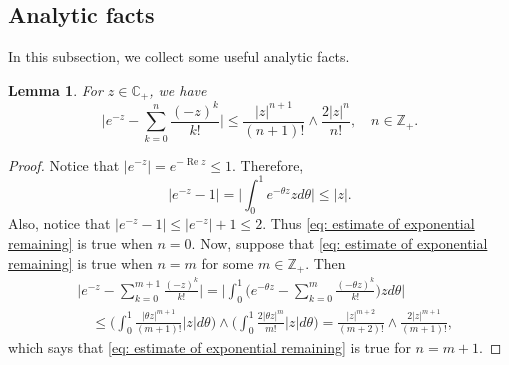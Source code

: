 \documentclass[12pt,a4paper]{amsart}
\theoremstyle{plain}
\newtheorem{lem}[thm]{Lemma}
\theoremstyle{definition}
\numberwithin{equation}{section}
\begin{document}
\subsection{Analytic facts}
In this subsection, we collect some useful analytic facts.
\begin{lem}
  \label{lem: estimate of exponential remaining}
  For $z\in \mathbb C_+$,  we have
  \begin{equation}
    \label{eq: estimate of exponential remaining}
    \Big|e^{-z} - \sum_{k=0}^n \frac{(-z)^k}{k!} \Big|
    \leq \frac{|z|^{n+1}}{(n+1)!} \wedge \frac{2|z|^{n}}{n!}, \quad n\in \mathbb Z_+.
  \end{equation}
\end{lem}
\begin{proof}
  Notice that $|e^{-z}| = e^{- \operatorname{Re} z} \leq 1$.
  Therefore,
\begin{equation}
  |e^{-z} - 1|
  = \Big| \int_0^1 e^{-\theta z} z d\theta\Big|
  \leq |z|.
\end{equation}
Also, notice that $|e^{-z} - 1| \leq |e^{-z}|+1 \leq 2$.
Thus \eqref{eq: estimate of exponential remaining} is true when $n = 0$.
Now, suppose that \eqref{eq: estimate of exponential remaining} is true when $n = m$ for some $m \in \mathbb Z_+$.
Then
\begin{align}
  &\Big|e^{-z} - \sum_{k=0}^{m+1} \frac{(-z)^k}{k!}\Big|
    = \Big| \int_0^1\Big(e^{-\theta z} - \sum_{k=0}^m \frac{(-\theta z)^k}{k!} \Big) z d\theta \Big| \\
  & \quad \leq  \Big(\int_0^1 \frac{|\theta z|^{m+1}}{(m+1)!} |z| d\theta\Big) \wedge \Big(\int_0^1 \frac{2|\theta z|^{m}}{m!} |z| d\theta\Big)
    = \frac{|z|^{m+2}}{(m+2)!} \wedge \frac{2|z|^{m+1}}{(m+1)!},
\end{align}
which says that \eqref{eq: estimate of exponential remaining} is true for $n = m + 1$.
\end{proof}
\end{document}

